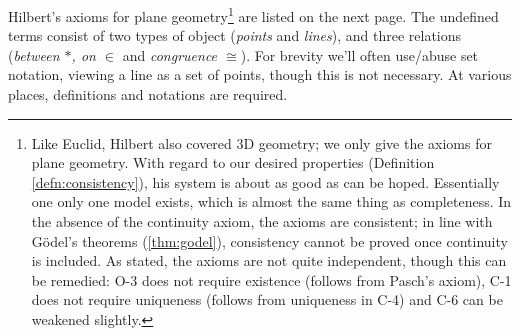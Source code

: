 Hilbert's axioms for plane geometry\footnote{Like Euclid, Hilbert also covered 3D geometry; we only give the axioms for plane geometry. With regard to our desired properties (Definition \ref{defn:consistency}), his system is about as good as can be hoped. Essentially one only one model exists, which is almost the same thing as completeness. In the absence of the continuity axiom, the axioms are consistent; in line with Gödel's theorems (\ref{thm:godel}), consistency cannot be proved once continuity is included. As stated, the axioms are not quite independent, though this can be remedied: O-3 does not require existence (follows from Pasch's axiom), C-1 does not require uniqueness (follows from uniqueness in C-4) and C-6 can be weakened slightly.} are listed on the next page. The undefined terms consist of two types of object (\emph{points} and \emph{lines}), and three relations (\emph{between $*$, on $\in$} and \emph{congruence $\cong$}). For brevity we'll often use/abuse set notation, viewing a line as a set of points, though this is not necessary. At various places, definitions and notations are required.

